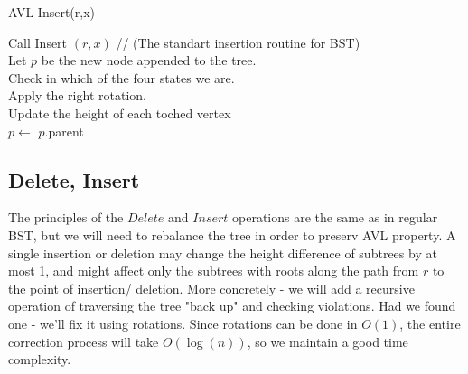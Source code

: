 \begin{algbox}{AVL Insert(r,x)}
  \begin{algorithm}[H]
    Call Insert $(r,x)$ // (The standart insertion routine for BST) \\  
    Let $p$ be the new node appended to the tree. \\
     {
      Check in which of the four states we are. \\ 
      Apply the right rotation. \\ 
      Update the height of each toched vertex  \\
      $p \leftarrow$ $p$.parent \\  
    }
  \end{algorithm}
\end{algbox}


\iffalse
\newpage
\subsection{Delete, Insert}
The principles of the $Delete$ and $Insert$ operations are the same as in
regular BST, but we will need to rebalance the tree in order to preserv AVL
property.
A single insertion or deletion may change the height difference of subtrees
by at most 1, and might affect only the subtrees with roots along the path
from $r$ to the point of insertion/ deletion.
More concretely - we will add a recursive operation of traversing the tree
"back up" and checking violations. Had we found one - we'll fix it using
rotations. Since rotations can be done in $O(1)$, the entire correction
process will take $O(\log(n))$, so we maintain a good time complexity.

